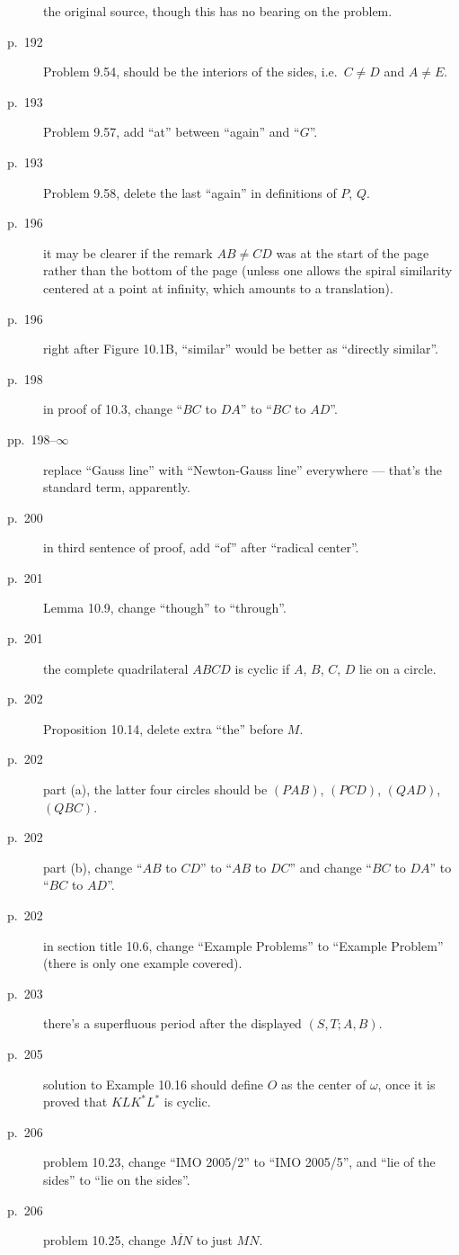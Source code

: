 \documentclass[11pt]{scrartcl}
\begin{document}
\begin{description}
  the original source, though this has no bearing on the problem.
\item[p.\  192] Problem 9.54, should be the interiors of the sides, i.e.\ $C \neq D$ and $A \neq E$.
\item[p.\  193] Problem 9.57, add ``at'' between ``again'' and ``$G$''.
\item[p.\  193] Problem 9.58, delete the last ``again'' in definitions of $P$, $Q$.
\item[p.\  196] it may be clearer if the remark $AB \neq CD$ was at the
  start of the page rather than the bottom of the page
  (unless one allows the spiral similarity centered at a point at infinity,
  which amounts to a translation).
\item[p.\  196] right after Figure 10.1B, ``similar'' would be better as ``directly similar''.
\item[p.\  198] in proof of 10.3, change ``$BC$ to $DA$'' to ``$BC$ to $AD$''.
\item[pp.\  198--$\infty$] replace ``Gauss line'' with ``Newton-Gauss line''
  everywhere --- that's the standard term, apparently.
\item[p.\  200] in third sentence of proof, add ``of'' after ``radical center''.
\item[p.\  201] Lemma 10.9, change ``though'' to ``through''.
\item[p.\  201] the complete quadrilateral $ABCD$ is cyclic if $A$, $B$, $C$, $D$ lie on a circle.
\item[p.\  202] Proposition 10.14, delete extra ``the'' before $M$.
\item[p.\  202] part (a), the latter four circles should be
  $(PAB)$, $(PCD)$, $(QAD)$, $(QBC)$.
\item[p.\  202] part (b), change ``$AB$ to $CD$'' to ``$AB$ to $DC$''
  and change ``$BC$ to $DA$'' to ``$BC$ to $AD$''.
\item[p.\  202] in section title 10.6, change ``Example Problems'' to ``Example Problem''
  (there is only one example covered).
\item[p.\  203] there's a superfluous period after the displayed $(S,T;A,B)$.
\item[p.\  205] solution to Example 10.16 should define $O$ as the center of $\omega$,
  once it is proved that $KL K^\ast L^\ast$ is cyclic.
\item[p.\  206] problem 10.23, change ``IMO 2005/2'' to ``IMO 2005/5'',
  and ``lie of the sides'' to ``lie on the sides''.
\item[p.\  206] problem 10.25, change $\overline{MN}$ to just $MN$.

\end{description}
\end{document}
